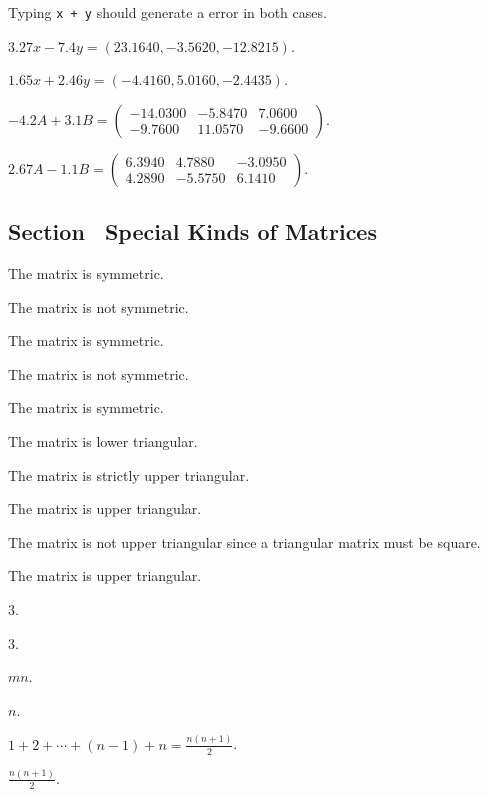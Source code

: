 \documentclass{ximera}
\begin{document}
Typing {\tt x + y} should generate a \Matlab error in both cases.

  $3.27x - 7.4y = (23.1640, -3.5620, -12.8215)$.

  $1.65x + 2.46y = (-4.4160, 5.0160, -2.4435)$.

  $-4.2A + 3.1B = \left(\begin{array}{rrr} 
-14.0300 & -5.8470 &    7.0600 \\
 -9.7600 & 11.0570 &   -9.6600\end{array}\right)$.

  $2.67A - 1.1B = \left(\begin{array}{rrr} 
    6.3940  &  4.7880 &  -3.0950\\
    4.2890  & -5.5750 &   6.1410 \end{array}\right)$.



\subsection*{Section~\protect{\ref{S:1.3}} Special Kinds of Matrices}

 The matrix is symmetric.

 The matrix is not symmetric.

 The matrix is symmetric.

 The matrix is not symmetric.

 The matrix is symmetric.

 The matrix is lower triangular.

 The matrix is strictly upper triangular.

 The matrix is upper triangular.

 The matrix is not upper triangular since a triangular
matrix must be square.

\newpage
{} The matrix is upper triangular.

 $3$.

 $3$.

 $mn$.

 $n$.

 $1 + 2 + \cdots + (n-1) + n = \frac{n(n + 1)}{2}$.

 $\frac{n(n + 1)}{2}$.
\end{document}
